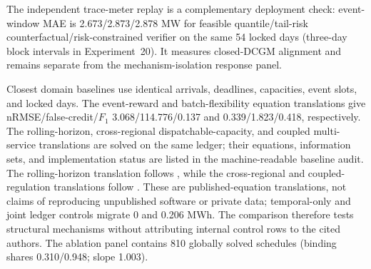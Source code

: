 \documentclass[10pt,journal]{IEEEtran}
\newcommand{\RiskSafe}{risk-constrained verifier}
\newcommand{\TailRisk}{tail-risk counterfactual}
\begin{document}
\begin{table}[t]
\centering
\caption{Locked 54-day mechanism-isolation response results (daily means).}
\label{tab:base}
\footnotesize
{}
\end{table}

The independent trace-meter replay is a complementary deployment check:
event-window MAE is 2.673/2.873/2.878 MW for feasible quantile/\TailRisk/\RiskSafe
on the same 54 locked days (three-day block intervals in Experiment~20). It
measures closed-DCGM alignment and remains separate from the
mechanism-isolation response panel.

Closest domain baselines use identical arrivals, deadlines, capacities, event
slots, and locked days. The event-reward and batch-flexibility equation
translations give nRMSE/false-credit/$F_1$ 3.068/114.776/0.137 and
0.339/1.823/0.418, respectively. The rolling-horizon, cross-regional
dispatchable-capacity, and coupled multi-service translations are solved on the
same ledger; their equations, information sets, and implementation status are
listed in the machine-readable baseline audit. The rolling-horizon translation
follows \cite{cao2022flexibility}, while the cross-regional and coupled-
regulation translations follow \cite{han2026dispatchable,chen2021idccoupling}.
These are
published-equation translations, not claims of reproducing unpublished
software or private data; temporal-only and joint ledger controls migrate 0
and 0.206 MWh. The comparison therefore tests structural mechanisms without
attributing internal control rows to the cited authors.
The ablation panel contains 810 globally solved schedules (binding shares
0.310/0.948; slope 1.003).
\end{document}
